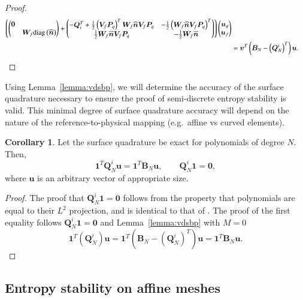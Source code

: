 \documentclass[preprint,10pt]{elsarticle}
\theoremstyle{definition}
\theoremstyle{lemma}
\theoremstyle{corollary}
\newtheorem{corollary}{Corollary}
\theoremstyle{theorem}
\theoremstyle{assumption}
\renewcommand{\hat}[1]{\widehat{#1}}
\newcommand{\LRp}[1]{\left( #1 \right)}
\newcommand{\diag}[1]{{\rm diag}\LRp{#1}}
\begin{document}
\begin{proof}
\begin{align*}
\LRp{\begin{pmatrix}
\bm{0}& \\
& \bm{W}_f\diag{\hat{\bm{n}}}
\end{pmatrix}
+
\begin{pmatrix}
-\bm{Q}_i^T + \frac{1}{2}\LRp{\bm{V}_f\bm{P}_q}^T\bm{W}_f\hat{\bm{n}} \bm{V}_f\bm{P}_q & -\frac{1}{2} \LRp{\bm{W}_f\hat{\bm{n}} \bm{V}_f\bm{P}_q}^T\\
\frac{1}{2}\bm{W}_f\hat{\bm{n}} \bm{V}_f\bm{P}_q & -\frac{1}{2}\bm{W}_f\hat{\bm{n}}
\end{pmatrix} } 
\begin{pmatrix} \bm{u}_q\\ \bm{u}_f\end{pmatrix}\\
&= \bm{v}^T\LRp{\bm{B}_N - \LRp{\bm{Q}^i_N}^T}\bm{u}.
\end{align*}
\end{proof}
Using Lemma~\ref{lemma:vdsbp}, we will determine the accuracy of the surface quadrature necessary to ensure the proof of semi-discrete entropy stability is valid.  This minimal degree of surface quadrature accuracy will depend on the nature of the reference-to-physical mapping (e.g.\ affine vs curved elements).

\begin{corollary}
\label{lemma:sbpcor}
Let the surface quadrature be exact for polynomials of degree $N$.  Then, 
\[
\bm{1}^T\bm{Q}^i_N\bm{u} = \bm{1}^T\bm{B}_N\bm{u}, \qquad \bm{Q}^i_N\bm{1} = \bm{0},
\]
where $\bm{u}$ is an arbitrary vector of appropriate size.  
\end{corollary}
\begin{proof}
The proof that $\bm{Q}^i_N \bm{1} = \bm{0}$ follows from the property that polynomials are equal to their $L^2$ projection, and is identical to that of \cite{chan2017discretely,chan2018discretely}.     The proof of the first equality follows $\bm{Q}^i_N \bm{1} = \bm{0}$ and Lemma~\ref{lemma:vdsbp} with $M=0$
\[
\bm{1}^T\LRp{\bm{Q}^i_N}\bm{u} = \bm{1}^T\LRp{\bm{B}_N - \LRp{\bm{Q}^i_N}^T}\bm{u} = \bm{1}^T{\bm{B}_N}\bm{u}.
\]
\end{proof}
\subsection{Entropy stability on affine meshes}
\end{document}
